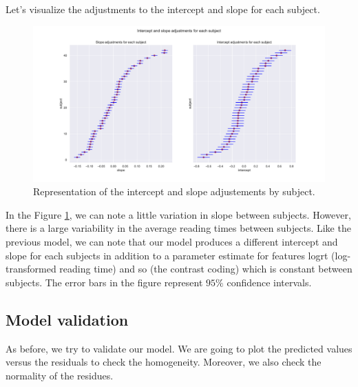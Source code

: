 \documentclass{article}
\begin{document}
Let's visualize the adjustments to the intercept and slope for each subject.

\begin{figure}[H]
    \centering
    \includegraphics[scale=.42]{./images/model2_inter.pdf}
    \caption{Representation of the intercept and slope adjustements by subject.}
    \label{fig:model2}
\end{figure}

In the Figure \ref{fig:model2}, we can note a little variation in slope between subjects. However, there is a large variability in the average reading times between subjects. Like the previous model, we can note that our model produces a different intercept and slope for each subjects in addition to a parameter estimate for features logrt (log-transformed reading time) and so (the contrast coding) which is constant between subjects. The error bars in the figure represent $95\%$ confidence intervals.

\subsection{Model validation}
As before, we try to validate our model.
We are going to plot the predicted values versus the residuals to check the homogeneity. Moreover, we also check the normality of the residues.
\end{document}
